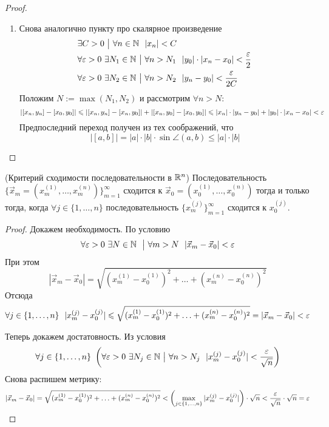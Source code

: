 \begin{proof}
\begin{enumerate}
		\item Снова аналогично пункту про скалярное произведение
		\begin{align*}
			&{\exists C > 0 \ \big|\  \forall n \in \mathbb{N}\ \ |x_n| < C}
			\\
			&{\forall \varepsilon > 0\ \exists N_1 \in \mathbb{N} \ \big|\  \forall n > N_1\ \ |y_0| \cdot |x_n - x_0| < \frac{\varepsilon}{2}}
			\\
			&{\forall \varepsilon > 0\ \exists N_2 \in \mathbb{N} \ \big|\  \forall n > N_2\ \ |y_n - y_0| < \frac{\varepsilon}{2C}}
		\end{align*}
		Положим $N := \max(N_1, N_2)$ и рассмотрим $\forall n > N$:
		\[
			|[x_n, y_n] - [x_0, y_0]| \leqslant |[x_n, y_n] - [x_n, y_0]| + |[x_n, y_0] - [x_0, y_0]| \leqslant |x_n| \cdot |y_n - y_0| + |y_0| \cdot |x_n - x_0| < \varepsilon
		\]
		Предпоследний переход получен из тех соображений, что
		\[
			|[a, b]| = |a| \cdot |b| \cdot \sin \angle(a, b) \le |a| \cdot |b|
		\]
	\end{enumerate}
\end{proof}

\begin{lemma} (Критерий сходимости последовательности в $\mathbb{R}^n$)
	Последовательность $\{\vec{x}_m = (x_m^{(1)}, \ldots, x_m^{(n)})\}_{m = 1}^\infty$ сходится к $\vec{x}_0 = (x_0^{(1)}, \ldots, x_0^{(n)})$ тогда и только тогда, когда $\forall j \in \{1, \ldots, n\}$ последовательность $\{x_m^{(j)}\}_{m = 1}^\infty$ сходится к $x_0^{(j)}$.
\end{lemma}

\begin{proof}
	Докажем необходимость. По условию
	\[
		\forall \varepsilon > 0\ \exists N \in \mathbb{N}\ \ \big|\  \forall m > N\ \ |\vec{x}_m - \vec{x}_0| < \varepsilon
	\]
	При этом
	\[
		|\vec{x}_m - \vec{x}_0| = \sqrt{(x_m^{(1)} - x_0^{(1)})^2 + \ldots + (x_m^{(n)} - x_0^{(n)})^2}
	\]
	Отсюда
	\[
		\forall j \in \{1, \ldots, n\}\ \ |x_m^{(j)} - x_0^{(j)}| \le \sqrt{(x_m^{(1)} - x_0^{(1)})^2 + \ldots + (x_m^{(n)} - x_0^{(n)})^2} = |\vec{x}_m - \vec{x}_0| < \eps
	\]
	
	Теперь докажем достатовность. Из условия
	\[
		\forall j \in \{1, \ldots, n\}\ \left(\forall \varepsilon > 0\ \exists N_j \in \mathbb{N} \ \big|\  \forall n > N_j\ \ |x_m^{(j)} - x_0^{(j)}| < \frac{\varepsilon}{\sqrt{n}}\right)
	\]
	Снова распишем метрику:
	\[
		|\vec{x}_m - \vec{x}_0| = \sqrt{(x_m^{(1)} - x_0^{(1)})^2 + \ldots + (x_m^{(n)} - x_0^{(n)})^2} < \left(\max\limits_{j \in \{1, \ldots, n\}} |x_m^{(j)} - x_0^{(j)}|\right) \cdot \sqrt{n} < \frac{\varepsilon}{\sqrt{n}} \cdot \sqrt{n} = \varepsilon
	\]
\end{proof}

